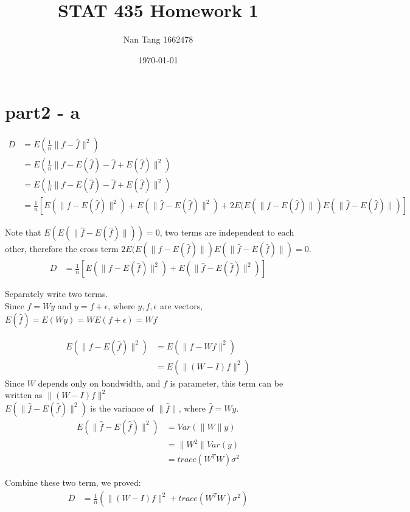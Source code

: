 \documentclass[11pt,letterpaper]{article}
\title{STAT 435 Homework 1}
\author{Nan Tang 1662478}
\date{\today}
\begin{document}
\section*{part2 - a}

\begin{align*}
D &= E(\frac{1}{n} \| f - \hat{f} \|^2 ) \\
&= E(\frac{1}{n} \| f - E(\hat{f}) - \hat{f} + E(\hat{f})\|^2 ) \\
&= E(\frac{1}{n} \| f - E(\hat{f}) - \hat{f} + E(\hat{f})\|^2 ) \\
&= \frac{1}{n} [E(\| f - E(\hat{f}) \|^2) + E(\| \hat{f} - E(\hat{f}) \|^2)  + 2E(E(\| f - E(\hat{f}) \|) E(\| \hat{f} - E(\hat{f} ) \|)]
\end{align*}

\noindent Note that $E(E(\|\hat{f} - E(\hat{f}) \|)) = 0$, two terms are independent to each other, therefore the cross term $2E(E(\| f - E(\hat{f}) \|) E(\| \hat{f} - E(\hat{f} ) \|) = 0$.
\begin{align*}
D &= \frac{1}{n} [E(\| f - E(\hat{f}) \|^2) + E(\| \hat{f} - E(\hat{f}) \|^2) ]
\end{align*}

\noindent Separately write two terms. \\

\noindent Since $\hat{f} = W y$ and $y = f + \epsilon$, where $y, f, \epsilon$ are vectors, $E(\hat{f}) = E(W y) = W E(f + \epsilon ) = W f$ 

\begin{align*}
E(\| f - E(\hat{f}) \|^2) &= E(\| f - Wf \|^2) \\
&= E(\| (W-I) f \|^2)
\end{align*}
\noindent Since $W$ depends only on bandwidth, and $f$ is parameter, this term can be written as $\| (W-I) f \|^2$\\


\noindent $E(\| \hat{f} - E(\hat{f}) \|^2)$ is the variance of $\| \hat{f} \|$, where $\hat{f} = W y$. 
\begin{align*}
E(\| \hat{f} - E(\hat{f}) \|^2) &= Var(\| W \| y ) \\
&= \| W^2 \| Var(y) \\
&= trace(W^T W) \sigma^2
\end{align*}

\noindent Combine these two term, we proved:
\begin{align*}
D &= \frac{1}{n} (\| (W-I) f \|^2 + trace(W^T W) \sigma^2 )
\end{align*}
\end{document}
